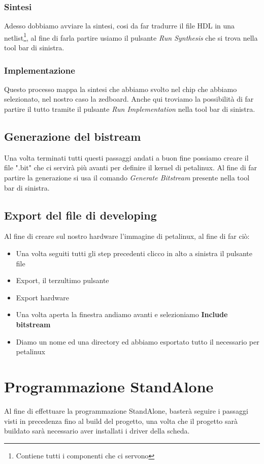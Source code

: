 \subsubsection{Sintesi}
Adesso dobbiamo avviare la sintesi, cosi da far tradurre il file HDL in una netlist\footnote{Contiene tutti i componenti che ci servono}, al fine di farla partire usiamo il pulsante \textit{Run Synthesis} che si trova nella tool bar di sinistra.
\subsubsection{Implementazione}
Questo processo mappa la sintesi che abbiamo svolto nel chip che abbiamo selezionato, nel nostro caso la zedboard. Anche qui troviamo la possibilità di far partire il tutto tramite il pulsante \textit{Run Implementation} nella tool bar di sinistra.
\subsection{Generazione del bistream}
Una volta terminati tutti questi passaggi andati a buon fine possiamo creare il file ".bit" che ci servirà più avanti per definire il kernel di petalinux. Al fine di far partire la generazione si usa il comando \textit{Generate Bitstream} presente nella tool bar di sinistra.
\subsection{Export del file di developing}\label{ExportVivado}
Al fine di creare sul nostro hardware l'immagine di petalinux, al fine di far ciò:
\begin{itemize}
\item Una volta seguiti tutti gli step precedenti clicco in alto a sinistra il pulsante file
\item Export, il terzultimo pulsante
\item Export hardware
\item Una volta aperta la finestra andiamo avanti e selezioniamo \textbf{Include bitstream}
\item Diamo un nome ed una directory ed abbiamo esportato tutto il necessario per petalinux
\end{itemize}




\section{Programmazione StandAlone}
\label{Standalone}
Al fine di effettuare la programmazione StandAlone, basterà seguire i passaggi visti in precedenza fino al build del progetto, una volta che il progetto sarà buildato sarà necessario aver installati i driver della scheda.
